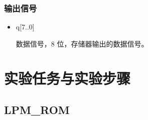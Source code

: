 \subsubsection{输出信号}

\begin{itemize}
    \item q[7..0]
    
    数据信号，8 位，存储器输出的数据信号。
    
\end{itemize}

\section{实验任务与实验步骤}

\subsection{LPM\_ROM}

